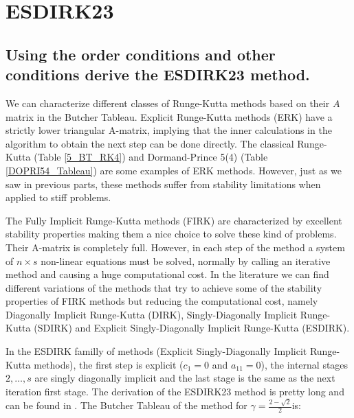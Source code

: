 \section{ESDIRK23}

\subsection{Using  the  order  conditions  and  other  conditions  derive  the  ESDIRK23 method.}
We can characterize different classes of Runge-Kutta methods based on their $A$ matrix in the Butcher Tableau. Explicit Runge-Kutta methods (ERK) have a strictly lower triangular A-matrix, implying that the inner calculations in the algorithm to obtain the next step can be done directly. The classical Runge-Kutta (Table \ref{5_BT_RK4}) and Dormand-Prince 5(4) (Table \ref{DOPRI54_Tableau}) are some examples of ERK methods. However, just as we saw in previous parts, these methods suffer from stability limitations when applied to stiff problems.

The Fully Implicit Runge-Kutta methods (FIRK) are characterized by excellent stability properties making them a nice choice to solve these kind of problems. Their A-matrix is completely full. However, in each step of the method a system of $n \times s$ non-linear equations must be solved, normally by calling an iterative method and causing a huge computational cost. In the literature we can find different variations of the methods that try to achieve some of the stability properties of FIRK methods but reducing the computational cost, namely Diagonally Implicit Runge-Kutta (DIRK), Singly-Diagonally Implicit Runge-Kutta (SDIRK) and Explicit Singly-Diagonally Implicit Runge-Kutta (ESDIRK). \cite{Bagterp3}

In the ESDIRK familly of methods (Explicit Singly-Diagonally Implicit Runge-Kutta methods), the first step is explicit ($c_1 = 0$ and $a_{11} = 0$), the internal stages $2, \ldots, s$ are singly diagonally implicit and the last stage is the same as the next iteration first stage. The derivation of the ESDIRK23 method is pretty long and can be found in \cite{Bagterp3}. The Butcher Tableau of the method for $\gamma = \frac{2 - \sqrt{2}}{2}$is:

